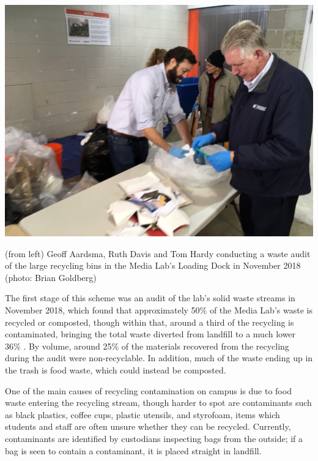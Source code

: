 \documentclass[nofonts,nols,justified,nobib]{tufte-book}
\begin{document}
\begin{marginfigure}
\includegraphics[width=\textwidth]{img/2/lab-audit.jpg}
\caption{(from left) Geoff Aardsma, Ruth Davis and Tom Hardy conducting a waste audit of the large recycling bins in the Media Lab's Loading Dock in November 2018 (photo: Brian Goldberg)}
\end{marginfigure}

The first stage of this scheme was an audit of the lab's solid waste streams in November 2018, which found that approximately 50\% of the Media Lab's waste is recycled or composted, though within that, around a third of the recycling is contaminated, bringing the total waste diverted from landfill to a much lower 36\% \cite{enevo_MIT_2018}. By volume, around 25\% of the materials recovered from the recycling during the audit were non-recyclable. In addition, much of the waste ending up in the trash is food waste, which could instead be composted.

One of the main causes of recycling contamination on campus is due to food waste entering the recycling stream, though harder to spot are contaminants such as black plastics, coffee cups, plastic utensils, and styrofoam, items which students and staff are often unsure whether they can be recycled. Currently, contaminants are identified by custodians inspecting bags from the outside; if a bag is seen to contain a contaminant, it is placed straight in landfill.
\end{document}
